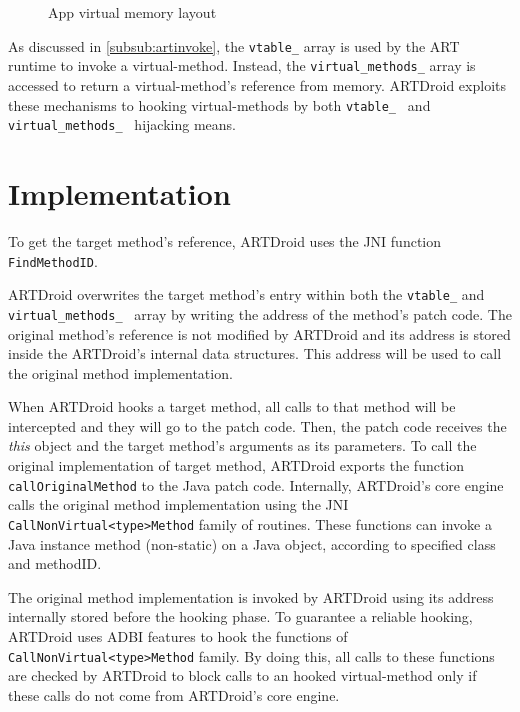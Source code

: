 \begin{figure}[H]
\centering
\caption{App virtual memory layout}
\end{figure}



As discussed in \ref{subsub:artinvoke}, the {\tt vtable\_} array is used by the ART runtime to invoke a virtual-method. Instead, the {\tt virtual\_methods\_} array is accessed to return a virtual-method’s reference from memory. ARTDroid exploits these mechanisms to hooking virtual-methods by both {\tt vtable\_ } and {\tt virtual\_methods\_ } hijacking means.



\section{Implementation}
\label{sec:impl}
To get the target method's reference, ARTDroid uses the JNI  function {\tt FindMethodID}. 


ARTDroid overwrites the target method's entry within both the {\tt vtable\_} and {\tt virtual\_methods\_ } array by writing the address of the method's patch code. The original method's reference is not modified by ARTDroid and its address is stored inside the ARTDroid's internal data structures. This address will be used to call the original method implementation. 


When ARTDroid hooks a target method, all calls to that method will be intercepted and they will go to the patch code. Then, the patch code receives the \textit{this} object and the target method's arguments as its parameters. To call the original implementation of target method, ARTDroid exports the function {\tt callOriginalMethod} to the Java patch code. Internally, ARTDroid's core engine calls the original method implementation using the JNI {\tt CallNonVirtual<type>Method} family of routines. These functions can invoke a Java instance method (non-static) on a Java object, according to specified class and methodID.

The original method implementation is invoked by ARTDroid using its address internally stored  before the hooking phase. To guarantee a reliable hooking, ARTDroid uses ADBI features to hook the functions of {\tt CallNonVirtual<type>Method} family. By doing this, all calls to these functions are checked by ARTDroid to block calls to an hooked virtual-method only if these calls do not come from ARTDroid's core engine.


